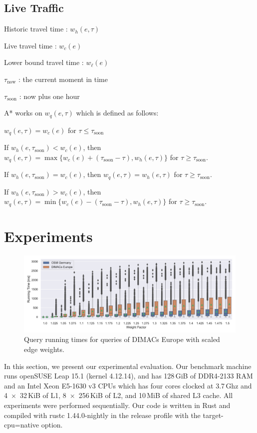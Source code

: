 \documentclass[sigconf]{acmart}
\begin{document}
\subsection{Live Traffic}


Historic travel time : $w_h(e,\tau)$

Live travel time : $w_c(e)$

Lower bound travel time : $w_\ell(e)$

$\tau_{\mathrm{now}}$ : the current moment in time

$\tau_{\mathrm{soon}}$ : now plus one hour 

A* works on $w_q(e,\tau)$ which is defined as follows:

$w_q(e,\tau) = w_c(e)$ for $\tau \le \tau_{\mathrm{soon}}$

If $w_h(e,\tau_{\mathrm{soon}}) < w_c(e)$, then $w_q(e,\tau) = \max\{w_c(e)+(\tau_{\mathrm{soon}}-\tau), w_h(e,\tau)\}$ for $\tau \ge \tau_{\mathrm{soon}}$.

If $w_h(e,\tau_{\mathrm{soon}}) = w_c(e)$, then $w_q(e,\tau) = w_h(e,\tau)$ for $\tau \ge \tau_{\mathrm{soon}}$.

If $w_h(e,\tau_{\mathrm{soon}}) > w_c(e)$, then $w_q(e,\tau) = \min\{w_c(e)-(\tau_{\mathrm{soon}}-\tau), w_h(e,\tau)\}$ for $\tau \ge \tau_{\mathrm{soon}}$.



\section{Experiments}

\label{sec:experiments}

\begin{figure}
\centering
\includegraphics[width=\textwidth]{fig/scaled_weights.pdf}
\caption{Query running times for queries of DIMACs Europe with scaled edge weights.}\label{fig:scaled_weights}
\end{figure}

In this section, we present our experimental evaluation.
Our benchmark machine runs openSUSE Leap 15.1 (kernel 4.12.14), and has 128\,GiB of DDR4-2133 RAM and an Intel Xeon E5-1630 v3 CPUs which has four cores clocked at 3.7\,Ghz and 4~$\times$~32\,KiB of L1, 8~$\times$~256\,KiB of L2, and 10\,MiB of shared L3 cache.
All experiments were performed sequentially.
Our code is written in Rust and compiled with rustc 1.44.0-nightly in the release profile with the target-cpu=native option.
\end{document}
